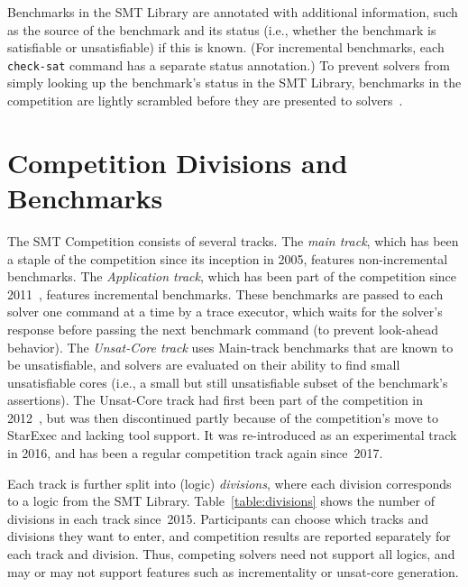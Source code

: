 \documentclass[dvipsnames,table,twoside,11pt]{article}
\begin{document}
Benchmarks in the SMT Library are annotated with additional
information, such as the source of the benchmark and its status (i.e.,
whether the benchmark is satisfiable or unsatisfiable) if this is
known.  (For incremental benchmarks, each {\tt check-sat} command has
a separate status annotation.)  To prevent solvers from simply looking
up the benchmark's status in the SMT Library, benchmarks in the
competition are lightly scrambled before they are presented to
solvers~\cite{DBLP:conf/cade/Weber16}.


\section{Competition Divisions and Benchmarks}
\label{sec:benchmarks}

The SMT Competition consists of several tracks.  The \emph{main
  track}, which has been a staple of the competition since its
inception in 2005, features non-incremental benchmarks.  The
\emph{Application track}, which has been part of the competition since
2011~\cite{BDdMOS13}, features incremental benchmarks.  These
benchmarks are passed to each solver one command at a time by a trace
executor, which waits for the solver's response before passing the
next benchmark command (to prevent look-ahead behavior).  The
\emph{Unsat-Core track} uses Main-track benchmarks that are known to
be unsatisfiable, and solvers are evaluated on their ability to find
small unsatisfiable cores (i.e., a small but still unsatisfiable
subset of the benchmark's assertions).  The Unsat-Core track had first
been part of the competition in 2012~\cite{CGBD12}, but was then
discontinued partly because of the competition's move to StarExec and
lacking tool support.  It was re-introduced as an experimental track
in 2016, and has been a regular competition track again since~2017.

Each track is further split into (logic) \emph{divisions}, where each
division corresponds to a logic from the SMT Library.
Table~\ref{table:divisions} shows the number of divisions in each
track since~2015.  Participants can choose which tracks and divisions
they want to enter, and competition results are reported separately
for each track and division.  Thus, competing solvers need not support
all logics, and may or may not support features such as incrementality
or unsat-core generation.
\end{document}
